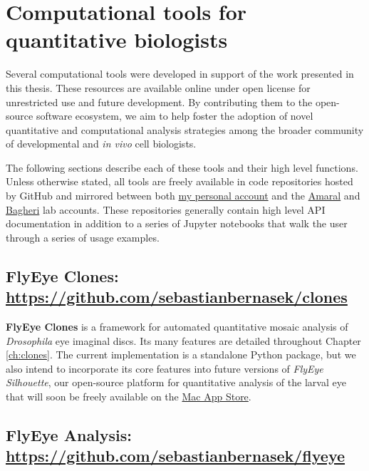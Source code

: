 \section{Computational tools for quantitative biologists}
\label{appendix:resources:software}

Several computational tools were developed in support of the work presented in this thesis. These resources are available online under open license for unrestricted use and future development. By contributing them to the open-source software ecosystem, we aim to help foster the adoption of novel quantitative and computational analysis strategies among the broader community of developmental and \textit{in vivo} cell biologists. 

The following sections describe each of these tools and their high level functions. Unless otherwise stated, all tools are freely available in code repositories hosted by GitHub and mirrored between both \href{https://github.com/sebastianbernasek/}{my personal account} and the \href{https://github.com/amarallab}{Amaral} and \href{https://github.com/bagherilab}{Bagheri} lab accounts. These repositories generally contain high level API documentation in addition to a series of Jupyter notebooks that walk the user through a series of usage examples. 

\subsection{\textbf{FlyEye Clones}: \url{https://github.com/sebastianbernasek/clones}}
\label{appendix:resources:clones}

\textbf{FlyEye Clones} is a framework for automated quantitative mosaic analysis of \textit{Drosophila} eye imaginal discs. Its many features are detailed throughout Chapter \ref{ch:clones}. The current implementation is a standalone Python package, but we also intend to incorporate its core features into future versions of \emph{FlyEye Silhouette}, our open-source platform for quantitative analysis of the larval eye that will soon be freely available on the \href{https://www.apple.com/ca/osx/apps/app-store/}{Mac App Store}. 

\subsection{\textbf{FlyEye Analysis}: \url{https://github.com/sebastianbernasek/flyeye}}
\label{appendix:resources:flyeye}

